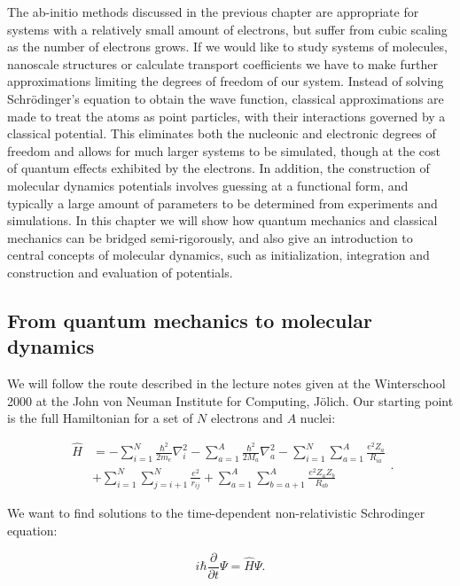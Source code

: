 The ab-initio methods discussed in the previous chapter
are appropriate for systems with a relatively small amount of electrons,
but suffer from cubic scaling as the number of electrons grows.
If we would like to study systems of molecules, nanoscale structures
or calculate transport coefficients we have to make further approximations
limiting the degrees of freedom of our system.
Instead of solving Schr\"{o}dinger's equation to obtain
the wave function, classical approximations are made to
treat the atoms as point particles, with their interactions
governed by a classical potential. This eliminates both the nucleonic
and electronic degrees of freedom and allows for much larger systems
to be simulated, though at the cost of quantum effects
exhibited by the electrons. In addition, the construction
of molecular dynamics potentials involves guessing at a functional
form, and typically a large amount of parameters to be determined
from experiments and simulations.
In this chapter we will show how quantum mechanics
and classical mechanics can be bridged semi-rigorously,
and also give an introduction to central concepts of molecular dynamics,
such as initialization, integration and construction and evaluation
of potentials.

\subsection{From quantum mechanics to molecular dynamics}
We will follow the route described in the lecture notes
\parencite[Marx, Dominik and Hutter, J\"{o}rg][pages 1-10]{marx2000}
given at the Winterschool 2000 at the John von Neuman Institute
for Computing, J\"{o}lich.
Our starting point is the full Hamiltonian 
for a set of $N$ electrons and $A$ nuclei:

\begin{equation}
    \begin{split}
        \hat{H}
        &= -\sum_{i=1}^N \frac{\hbar^2}{2m_e} \nabla_i^2
        -\sum_{a=1}^A \frac{\hbar^2}{2M_a} \nabla_a^2
        -\sum_{i=1}^N \sum_{a=1}^A \frac{e^2 Z_a}{R_{ia}} \\
        &+ \sum_{i=1}^N \sum_{j=i+1}^N \frac{e^2}{r_{ij}}
        + \sum_{a=1}^A \sum_{b=a+1}^A \frac{e^2 Z_a Z_b}{R_{ab}}
    \end{split} .
\end{equation}

We want to find solutions to the time-dependent non-relativistic
Schrodinger equation:

\begin{equation}
 i\hbar \frac{\partial}{\partial t} \Psi = \hat{H} \Psi . 
\end{equation}

